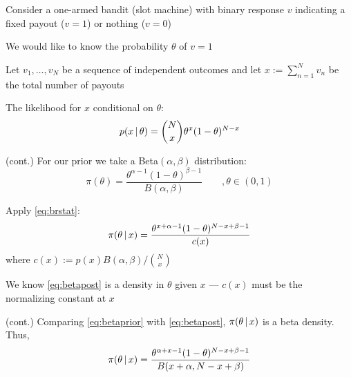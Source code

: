 \begin{frame}

    \vspace{2em}
    \Eg
    Consider a one-armed bandit (slot machine) with binary response $v$
    indicating a fixed payout ($v=1$) or nothing ($v=0$)
    
    We would 
    like to know the probability $\theta$ of $v=1$
    
    \vspace{.7em}
    Let $v_1, \ldots, v_N$ be
    a sequence of independent outcomes and let $x := \sum_{n=1}^N v_n$ be the
    total number of payouts
    
    The likelihood for $x$ conditional on $\theta$:
    \begin{equation*}
        p(x \, | \, \theta) 
        = {N \choose x} \theta^{x} (1-\theta)^{N-x}
    \end{equation*}

\end{frame}

\begin{frame}

    \vspace{2em}
    \Eg (cont.)
    For our prior we take a Beta$(\alpha, \beta)$ distribution:
    \begin{equation}
        \label{eq:betaprior}
        \pi(\theta) 
        = \frac{\theta^{\alpha-1} (1-\theta)^{\beta-1}}{B(\alpha, \beta)}\qquad ,\theta\in (0,1)
    \end{equation}
    
    Apply \eqref{eq:brstat}:
    \begin{equation}
        \label{eq:betapost}
        \pi(\theta \, | \, x)
        = \frac{ \theta^{x + \alpha - 1} (1 - \theta)^{N - x + \beta - 1}}
                {c(x)}
    \end{equation}
    where $c(x) := p(x) B(\alpha, \beta) / {N \choose x}$
     
    \vspace{.7em}
    We
    know  \eqref{eq:betapost} is a density in $\theta$ given $x$ --- $c(x)$
    must be the normalizing constant at $x$

\end{frame}

\begin{frame}
    
    \vspace{2em}
    \Eg (cont.)
    Comparing
    \eqref{eq:betaprior} with \eqref{eq:betapost},  $\pi(\theta
    \, | \, x)$ is a beta density. Thus,
    \begin{equation*}
        \label{eq:betapost2}
        \pi(\theta \, | \, x)
        = \frac{ \theta^{\alpha + x - 1} (1 - \theta)^{N - x + \beta - 1}}
        {B(x + \alpha, N - x + \beta)}
    \end{equation*}
    
\end{frame}

